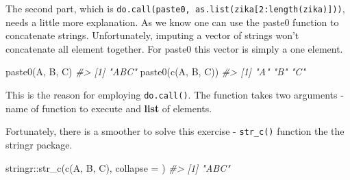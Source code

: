 \documentclass[
]{book}
\newenvironment{Shaded}{\begin{snugshade}}{\end{snugshade}}
\newcommand{\AttributeTok}[1]{\textcolor[rgb]{0.77,0.63,0.00}{#1}}
\newcommand{\CommentTok}[1]{\textcolor[rgb]{0.56,0.35,0.01}{\textit{#1}}}
\newcommand{\DecValTok}[1]{\textcolor[rgb]{0.00,0.00,0.81}{#1}}
\newcommand{\FunctionTok}[1]{\textcolor[rgb]{0.00,0.00,0.00}{#1}}
\newcommand{\NormalTok}[1]{#1}
\newcommand{\SpecialCharTok}[1]{\textcolor[rgb]{0.00,0.00,0.00}{#1}}
\newcommand{\StringTok}[1]{\textcolor[rgb]{0.31,0.60,0.02}{#1}}
\begin{document}
The second part, which is \texttt{do.call(paste0,\ as.list(zika{[}2:length(zika){]}))}, needs a little more explanation. As we know one can use the paste0 function to concatenate strings. Unfortunately, imputing a vector of strings won't concatenate all element together. For paste0 this vector is simply a one element.

\begin{Shaded}
\begin{Highlighting}[]
\FunctionTok{paste0}\NormalTok{(}\StringTok{\textquotesingle{}A\textquotesingle{}}\NormalTok{, }\StringTok{\textquotesingle{}B\textquotesingle{}}\NormalTok{, }\StringTok{\textquotesingle{}C\textquotesingle{}}\NormalTok{)}
\CommentTok{\#\textgreater{} [1] "ABC"}
\FunctionTok{paste0}\NormalTok{(}\FunctionTok{c}\NormalTok{(}\StringTok{\textquotesingle{}A\textquotesingle{}}\NormalTok{, }\StringTok{\textquotesingle{}B\textquotesingle{}}\NormalTok{, }\StringTok{\textquotesingle{}C\textquotesingle{}}\NormalTok{))}
\CommentTok{\#\textgreater{} [1] "A" "B" "C"}
\end{Highlighting}
\end{Shaded}

This is the reason for employing \texttt{do.call()}. The function takes two arguments - name of function to execute and \textbf{list} of elements.

Fortunately, there is a smoother to solve this exercise - \texttt{str\_c()} function the the stringr package.

\begin{Shaded}
\begin{Highlighting}[]
\NormalTok{stringr}\SpecialCharTok{::}\FunctionTok{str\_c}\NormalTok{(}\FunctionTok{c}\NormalTok{(}\StringTok{\textquotesingle{}A\textquotesingle{}}\NormalTok{, }\StringTok{\textquotesingle{}B\textquotesingle{}}\NormalTok{, }\StringTok{\textquotesingle{}C\textquotesingle{}}\NormalTok{), }\AttributeTok{collapse =} \StringTok{\textquotesingle{}\textquotesingle{}}\NormalTok{)}
\CommentTok{\#\textgreater{} [1] "ABC"}
\end{Highlighting}
\end{Shaded}

\begin{Shaded}
\end{Shaded}
\end{document}
